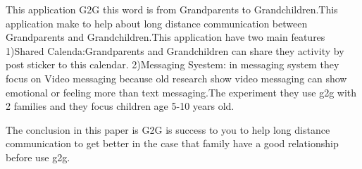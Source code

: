 This application G2G this word is from Grandparents to Grandchildren.This application make to help about long distance communication between Grandparents and Grandchildren.This application have two main features 1)Shared Calenda:Grandparents and Grandchildren can share they activity by post sticker to this calendar. 2)Messaging Syestem: in messaging system they focus on Video messaging because old research show video messaging can show emotional or feeling more than text messaging.The experiment they use g2g with 2 families and they focus children age 5-10 years old.

The conclusion in this paper is G2G is success to you to help long distance communication to get better in the case that family have a good relationship before use g2g.